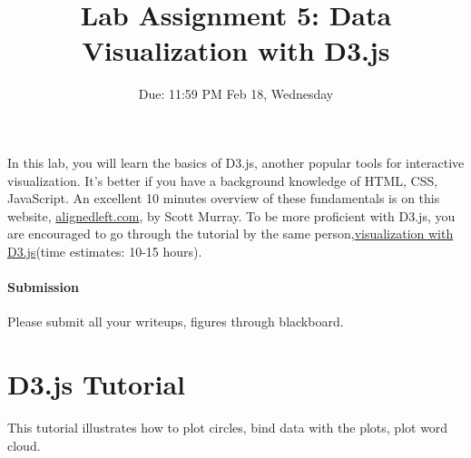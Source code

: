 \documentclass[a4paper, 11pt]{article}
\title{ Lab Assignment 5: Data Visualization with D3.js}
\author{Due: 11:59 PM Feb 18, Wednesday }
\date{}
\begin{document}
\maketitle
In this lab, you will learn the basics of D3.js, another popular tools for interactive visualization. It's better if you have a background knowledge of HTML, CSS, JavaScript. An excellent 10 minutes overview of these fundamentals is on this website, \href{http://alignedleft.com/tutorials/d3/fundamentals}{alignedleft.com}, by Scott Murray. To be more proficient with D3.js, you are encouraged to go through the tutorial by the same person,\href{http://alignedleft.com/tutorials/d3}{visualization with D3.js}(time estimates: 10-15 hours).

\paragraph*{Submission} Please submit all your writeups, figures through blackboard.
\section{D3.js Tutorial}
This tutorial illustrates how to plot circles, bind data with the plots, plot word cloud. 
\end{document}
